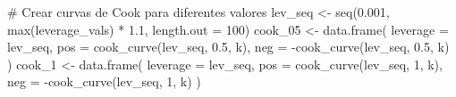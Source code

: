 \documentclass[
  letterpaper,
  DIV=11,
  numbers=noendperiod]{scrreprt}
\newenvironment{Shaded}{\begin{snugshade}}{\end{snugshade}}
\newcommand{\AttributeTok}[1]{\textcolor[rgb]{0.40,0.45,0.13}{#1}}
\newcommand{\CommentTok}[1]{\textcolor[rgb]{0.37,0.37,0.37}{#1}}
\newcommand{\DecValTok}[1]{\textcolor[rgb]{0.68,0.00,0.00}{#1}}
\newcommand{\FloatTok}[1]{\textcolor[rgb]{0.68,0.00,0.00}{#1}}
\newcommand{\FunctionTok}[1]{\textcolor[rgb]{0.28,0.35,0.67}{#1}}
\newcommand{\NormalTok}[1]{\textcolor[rgb]{0.00,0.23,0.31}{#1}}
\newcommand{\OtherTok}[1]{\textcolor[rgb]{0.00,0.23,0.31}{#1}}
\newcommand{\SpecialCharTok}[1]{\textcolor[rgb]{0.37,0.37,0.37}{#1}}
\begin{document}
\begin{tcolorbox}
\begin{Shaded}
\begin{Highlighting}[]
\CommentTok{\# Crear curvas de Cook para diferentes valores}
\NormalTok{lev\_seq }\OtherTok{\textless{}{-}} \FunctionTok{seq}\NormalTok{(}\FloatTok{0.001}\NormalTok{, }\FunctionTok{max}\NormalTok{(leverage\_vals) }\SpecialCharTok{*} \FloatTok{1.1}\NormalTok{, }\AttributeTok{length.out =} \DecValTok{100}\NormalTok{)}
\NormalTok{cook\_05 }\OtherTok{\textless{}{-}} \FunctionTok{data.frame}\NormalTok{(}
  \AttributeTok{leverage =}\NormalTok{ lev\_seq,}
  \AttributeTok{pos =} \FunctionTok{cook\_curve}\NormalTok{(lev\_seq, }\FloatTok{0.5}\NormalTok{, k),}
  \AttributeTok{neg =} \SpecialCharTok{{-}}\FunctionTok{cook\_curve}\NormalTok{(lev\_seq, }\FloatTok{0.5}\NormalTok{, k)}
\NormalTok{)}
\NormalTok{cook\_1 }\OtherTok{\textless{}{-}} \FunctionTok{data.frame}\NormalTok{(}
  \AttributeTok{leverage =}\NormalTok{ lev\_seq,}
  \AttributeTok{pos =} \FunctionTok{cook\_curve}\NormalTok{(lev\_seq, }\DecValTok{1}\NormalTok{, k),}
  \AttributeTok{neg =} \SpecialCharTok{{-}}\FunctionTok{cook\_curve}\NormalTok{(lev\_seq, }\DecValTok{1}\NormalTok{, k)}
\NormalTok{)}


\end{Highlighting}
\end{Shaded}
\end{tcolorbox}
\end{document}
